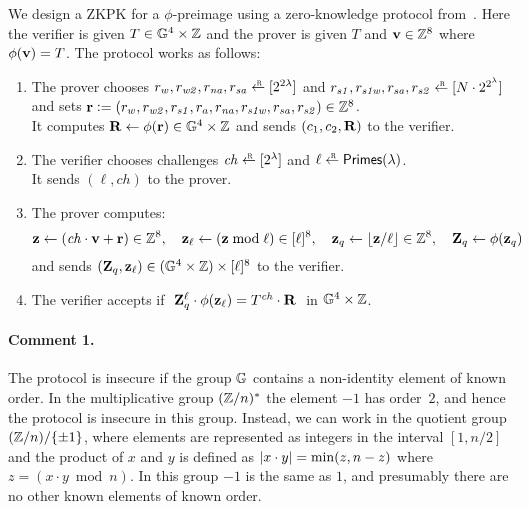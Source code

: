 \documentclass[11pt]{article}
\begin{document}
\begin{itemize}
We design a ZKPK for a $\phi$-preimage 
using a zero-knowledge protocol from~\cite[\S 3.5]{ourpaper}.
Here the verifier is given $T \in \mathbb G^4 \times \mathbb Z$ 
and the prover is given $T$ and $\mathbf{v} \in \mathbb Z^8$
where $\phi(\mathbf{v}) = T$. 
The protocol works as follows:
\begin{enumerate}
\item The prover chooses
 $r_w, r_\mathit{w2}, r_\mathit{na}, r_\mathit{sa} \rgets \range{{2^{2\lambda}}}$
 and
 $r_\mathit{s1}, r_\mathit{s1w}, r_\mathit{sa}, r_\mathit{s2} \rgets \range{N \cdot 2^{2^\lambda}}$ and sets
    $\mathbf{r} \mathrel{\mathop:}= (r_w, r_\mathit{w2}, r_\mathit{s1}, r_a, r_\mathit{na}, 
                     r_\mathit{s1w}, r_\mathit{sa}, r_\mathit{s2}) \in \mathbb Z^8$. \\
It computes $\mathbf{R} \gets \phi(\mathbf{r}) \in \mathbb G^4 \times \mathbb Z$
and sends $(c_1, c_2, \mathbf{R})$ to the verifier.

\item The verifier chooses challenges $\mathit{ch} \rgets \range{2^\lambda}$
and $\ell \rgets \primes$. \\
It sends $(\ell, \mathit{ch})$ to the prover.

\item The prover computes:
\[  \mathbf{z} \gets (\mathit{ch} \cdot \mathbf{v} + \mathbf{r}) \in \mathbb Z^8, \quad
    \mathbf{z}_\ell \gets (\mathbf{z} \bmod \ell) \in [{\ell}]^8, \quad
    \mathbf{z}_q \gets \lfloor \mathbf{z} / \ell \rfloor \in \mathbb Z^8, \quad
    \mathbf{Z}_q \gets \phi(\mathbf{z}_q)  
\]
and sends $(\mathbf{Z}_q, \mathbf{z}_\ell) \in (\mathbb G^4 \times \mathbb Z) \times [{\ell}]^8$ 
to the verifier. 

\item The verifier accepts if 
$\ \mathbf{Z}_q^\ell \cdot \phi(\mathbf{z}_\ell) = T^\mathit{ch} \cdot \mathbf{R}\ $ in 
$\mathbb G^4 \times \mathbb Z$.
\end{enumerate}
\end{itemize}


\paragraph{Comment 1.}
The protocol is insecure if the group $\mathbb G$ contains a non-identity
element of known order.  In the multiplicative group $(\mathbb Z/n)^*$ the
element $-1$ has order~$2$, and hence the protocol is insecure in this
group.  Instead, we can work in the quotient group $(\mathbb Z/n)/\{\pm 1\}$, 
where elements are represented as integers in the interval $[1,n/2]$
and the product of $x$ and $y$ is defined as 
$\lvert x \cdot y \rvert = \min(z, n-z)$ where $z = (x \cdot y \bmod n)$.
In this group $-1$ is the same as $1$, and presumably there are
no other known elements of known order.
\end{document}
